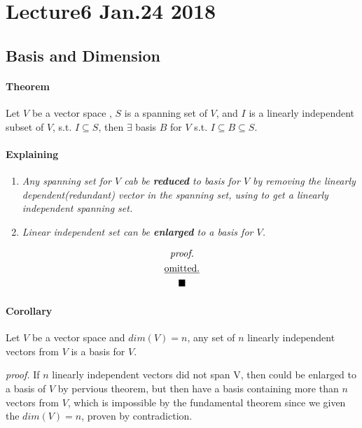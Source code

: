 \documentclass[11pt]{article}
\begin{document}
	\section{Lecture6 Jan.24 2018}
	\subsection{Basis and Dimension}
	\paragraph{Theorem} Let $V$ be a vector space , $S$ is a spanning set of $V$, and $I$ is a linearly independent subset of $V$, s.t. $I \subseteq S$, then $\exists$ basis $B$ for $V$ s.t. $I \subseteq B \subseteq S$.
	\paragraph{Explaining}
	\begin{enumerate}
		\item \emph{Any spanning set for $V$ cab be \textbf{reduced} to basis for $V$ by removing the linearly dependent(redundant) vector in the spanning set, using  to get a linearly independent spanning set.}
		\item \emph{Linear independent set can be \textbf{enlarged} to a basis for $V$.}
	\end{enumerate}
	\begin{multline*}
		\emph{proof.}\\
		\underbar{omitted.}\\
		\blacksquare
	\end{multline*}
	\paragraph{Corollary} Let $V$ be a vector space and $dim(V)=n$, any set of $n$ linearly independent vectors from $V$ is a basis for $V$.
	\newline \quad
	
	
	\emph{proof.} If $n$ linearly independent vectors did not span V, then could be enlarged to a basis of $V$ by pervious theorem, but then have a basis containing more than $n$ vectors from $V$, which is impossible by the fundamental theorem since we given the $dim(V) = n$, proven by contradiction.
	
\end{document}
